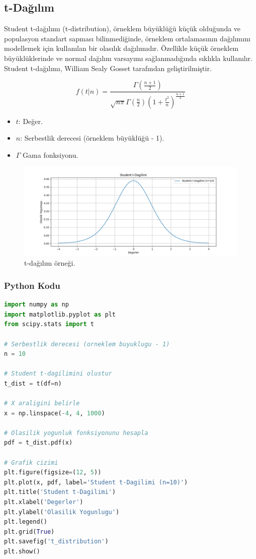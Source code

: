 \newpage

\subsection{t-Dağılım}
Student t-dağılımı (t-distribution), örneklem büyüklüğü küçük olduğunda ve populasyon standart sapması bilinmediğinde, örneklem ortalamasının dağılımını modellemek için kullanılan bir olasılık dağılımıdır. Özellikle küçük örneklem büyüklüklerinde ve normal dağılım varsayımı sağlanmadığında sıklıkla kullanılır. Student t-dağılımı, William Sealy Gosset tarafından geliştirilmiştir.

\[f(t|n) = \frac{\Gamma\left(\frac{n+1}{2}\right)}{\sqrt{n\pi}\Gamma\left(\frac{n}{2}\right)\left(1+\frac{t^2}{n}\right)^{\frac{n+1}{2}}}\]
\begin{itemize}
	\item $t$: Değer.
	\item $n$: Serbestlik derecesi (örneklem büyüklüğü - 1).
	\item $\Gamma$ Gama fonksiyonu.
\end{itemize}

\begin{figure}[h]
    \centering
    \includegraphics[width=1\textwidth]{images/t_distribution.png}
    \caption{t-dağılım örneği.}
    \label{fig:enter-label}
\end{figure}

\subsubsection{Python Kodu}

\begin{lstlisting}[language=Python]
import numpy as np
import matplotlib.pyplot as plt
from scipy.stats import t

# Serbestlik derecesi (orneklem buyuklugu - 1)
n = 10

# Student t-dagilimini olustur
t_dist = t(df=n)

# X araligini belirle
x = np.linspace(-4, 4, 1000)

# Olasilik yogunluk fonksiyonunu hesapla
pdf = t_dist.pdf(x)

# Grafik cizimi
plt.figure(figsize=(12, 5))
plt.plot(x, pdf, label='Student t-Dagilimi (n=10)')
plt.title('Student t-Dagilimi')
plt.xlabel('Degerler')
plt.ylabel('Olasilik Yogunlugu')
plt.legend()
plt.grid(True)
plt.savefig('t_distribution')
plt.show()
\end{lstlisting}

